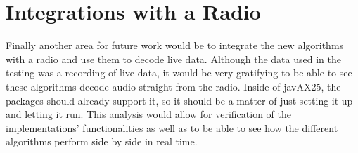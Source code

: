 \section{Integrations with a Radio}
Finally another area for future work would be to integrate the new algorithms with a radio and use them to decode live data. Although the data used in the testing was a recording of live data, it would be very gratifying to be able to see these algorithms decode audio straight from the radio. Inside of javAX25, the packages should already support it, so it should be a matter of just setting it up and letting it run. This analysis would allow for verification of the implementations' functionalities as well as to be able to see how the different algorithms perform side by side in real time.

